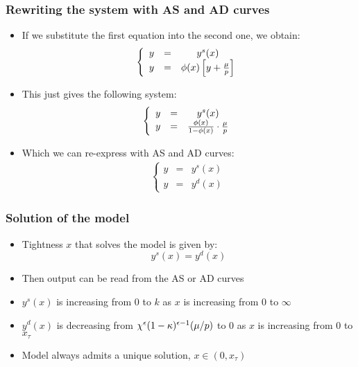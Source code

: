 \documentclass[11pt,aspectratio=169,xcolor={dvipsnames},hyperref={pdftex,pdfpagemode=UseNone,hidelinks,pdfdisplaydoctitle=true},usepdftitle=false]{beamer}
\begin{document}
\begin{frame}
\frametitle{Rewriting the system with AS and AD curves}
\begin{itemize}
\item If we substitute the first equation into the second one, we obtain:
\begin{align*}
\left\lbrace\begin{array}{ccc}
y & = & y^s(x)\\
y & = &  \phi(x)\left[ y + \frac{\mu}{p} \right]
\end{array}\right.
\end{align*}
\item This just gives the following system:
\begin{align*}
\left\lbrace\begin{array}{ccc}
y & = & y^s(x)\\
y & = &  \frac{\phi(x)}{1-\phi(x)}\cdot \frac{\mu}{p}
\end{array}\right.
\end{align*}
\item Which we can re-express with AS and AD curves:
\begin{align*}
\left\lbrace\begin{array}{ccc}
y & = & y^s(x)\\
y & = & y^d(x)
\end{array}\right.
\end{align*}
\end{itemize}	
\end{frame}

\begin{frame}
\frametitle{Solution of the model}
\begin{itemize}
\item Tightness $x$ that solves the model is given by:
\begin{equation*}
y^s(x) = y^d(x)
\end{equation*}
\item Then output can be read from the AS or AD curves
\item $y^s(x)$ is increasing from $0$ to $k$ as $x$ is increasing from 0 to $\infty$
\item $y^d(x)$ is decreasing from $ \chi^{\epsilon} (1-\kappa)^{\epsilon-1} (\mu/p)$  to $0$ as $x$ is increasing from 0 to $x_{\tau}$
\item[\then] Model always admits a unique solution, $x \in (0,x_{\tau})$
\end{itemize}	
\end{frame}
\end{document}
